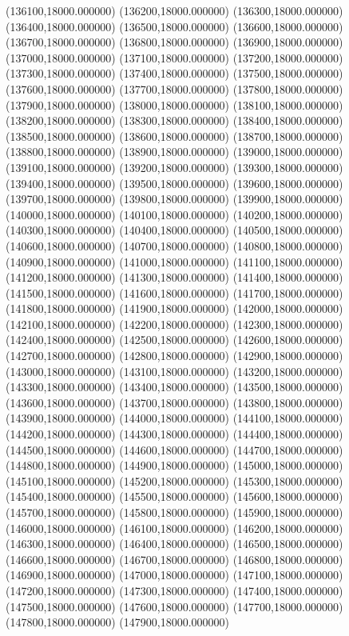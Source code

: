 (136100,18000.000000)
(136200,18000.000000)
(136300,18000.000000)
(136400,18000.000000)
(136500,18000.000000)
(136600,18000.000000)
(136700,18000.000000)
(136800,18000.000000)
(136900,18000.000000)
(137000,18000.000000)
(137100,18000.000000)
(137200,18000.000000)
(137300,18000.000000)
(137400,18000.000000)
(137500,18000.000000)
(137600,18000.000000)
(137700,18000.000000)
(137800,18000.000000)
(137900,18000.000000)
(138000,18000.000000)
(138100,18000.000000)
(138200,18000.000000)
(138300,18000.000000)
(138400,18000.000000)
(138500,18000.000000)
(138600,18000.000000)
(138700,18000.000000)
(138800,18000.000000)
(138900,18000.000000)
(139000,18000.000000)
(139100,18000.000000)
(139200,18000.000000)
(139300,18000.000000)
(139400,18000.000000)
(139500,18000.000000)
(139600,18000.000000)
(139700,18000.000000)
(139800,18000.000000)
(139900,18000.000000)
(140000,18000.000000)
(140100,18000.000000)
(140200,18000.000000)
(140300,18000.000000)
(140400,18000.000000)
(140500,18000.000000)
(140600,18000.000000)
(140700,18000.000000)
(140800,18000.000000)
(140900,18000.000000)
(141000,18000.000000)
(141100,18000.000000)
(141200,18000.000000)
(141300,18000.000000)
(141400,18000.000000)
(141500,18000.000000)
(141600,18000.000000)
(141700,18000.000000)
(141800,18000.000000)
(141900,18000.000000)
(142000,18000.000000)
(142100,18000.000000)
(142200,18000.000000)
(142300,18000.000000)
(142400,18000.000000)
(142500,18000.000000)
(142600,18000.000000)
(142700,18000.000000)
(142800,18000.000000)
(142900,18000.000000)
(143000,18000.000000)
(143100,18000.000000)
(143200,18000.000000)
(143300,18000.000000)
(143400,18000.000000)
(143500,18000.000000)
(143600,18000.000000)
(143700,18000.000000)
(143800,18000.000000)
(143900,18000.000000)
(144000,18000.000000)
(144100,18000.000000)
(144200,18000.000000)
(144300,18000.000000)
(144400,18000.000000)
(144500,18000.000000)
(144600,18000.000000)
(144700,18000.000000)
(144800,18000.000000)
(144900,18000.000000)
(145000,18000.000000)
(145100,18000.000000)
(145200,18000.000000)
(145300,18000.000000)
(145400,18000.000000)
(145500,18000.000000)
(145600,18000.000000)
(145700,18000.000000)
(145800,18000.000000)
(145900,18000.000000)
(146000,18000.000000)
(146100,18000.000000)
(146200,18000.000000)
(146300,18000.000000)
(146400,18000.000000)
(146500,18000.000000)
(146600,18000.000000)
(146700,18000.000000)
(146800,18000.000000)
(146900,18000.000000)
(147000,18000.000000)
(147100,18000.000000)
(147200,18000.000000)
(147300,18000.000000)
(147400,18000.000000)
(147500,18000.000000)
(147600,18000.000000)
(147700,18000.000000)
(147800,18000.000000)
(147900,18000.000000)
